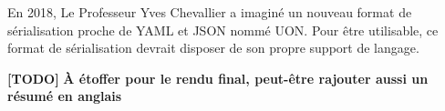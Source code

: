 En 2018, Le Professeur Yves Chevallier a imaginé un nouveau format de sérialisation proche de YAML et JSON nommé UON.
Pour être utilisable, ce format de sérialisation devrait disposer de son propre support de langage.

\textbf{[TODO]}
\textbf{À étoffer pour le rendu final, peut-être rajouter aussi un résumé en anglais}
